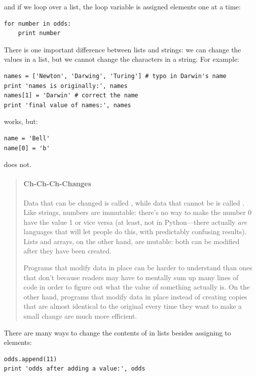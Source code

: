 \documentclass{book}
\begin{document}
and if we loop over a list, the loop variable is assigned elements one
at a time:

\begin{verbatim}
for number in odds:
    print number
\end{verbatim}

There is one important difference between lists and strings: we can
change the values in a list, but we cannot change the characters in a
string. For example:

\begin{verbatim}
names = ['Newton', 'Darwing', 'Turing'] # typo in Darwin's name
print 'names is originally:', names
names[1] = 'Darwin' # correct the name
print 'final value of names:', names
\end{verbatim}

works, but:

\begin{verbatim}
name = 'Bell'
name[0] = 'b'
\end{verbatim}

does not.

\begin{quote}
\mbox{}\paragraph{Ch-Ch-Ch-Changes}

Data that can be changed is called , while
data that cannot be is called . Like
strings, numbers are immutable: there's no way to make the number 0 have
the value 1 or vice versa (at least, not in Python---there actually
\emph{are} languages that will let people do this, with predictably
confusing results). Lists and arrays, on the other hand, are mutable:
both can be modified after they have been created.

Programs that modify data in place can be harder to understand than ones
that don't because readers may have to mentally sum up many lines of
code in order to figure out what the value of something actually is. On
the other hand, programs that modify data in place instead of creating
copies that are almost identical to the original every time they want to
make a small change are much more efficient.
\end{quote}

There are many ways to change the contents of in lists besides assigning
to elements:

\begin{verbatim}
odds.append(11)
print 'odds after adding a value:', odds
\end{verbatim}
\end{document}
